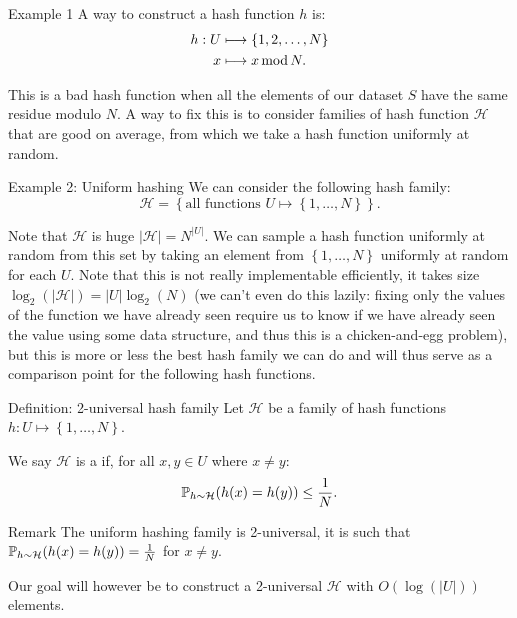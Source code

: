 \documentclass[a4paper]{article}
\begin{document}
\begin{parag}{Example 1}
    A way to construct a hash function $h$ is: 
    \[\begin{split}
    h: U &\longmapsto \left\{1, 2, \ldots, N\right\} \\
    x &\longmapsto x \Mod N.
    \end{split}\]
    
    This is a bad hash function when all the elements of our dataset $S$ have the same residue modulo $N$. A way to fix this is to consider families of hash function $\mathcal{H}$ that are good on average, from which we take a hash function uniformly at random.
\end{parag}

\begin{parag}{Example 2: Uniform hashing}
    We can consider the following hash family: 
    \[\mathcal{H} = \left\{\text{all functions $U \mapsto \left\{1, \ldots, N\right\}$}\right\}.\]

    Note that $\mathcal{H}$ is huge $\left|\mathcal{H}\right| = N^{\left|U\right|}$. We can sample a hash function uniformly at random from this set by taking an element from $\left\{1, \ldots, N\right\}$ uniformly at random for each $U$. Note that this is not really implementable efficiently, it takes size $\log_2\left(\left|\mathcal{H}\right|\right) = \left|U\right|\log_2\left(N\right)$ (we can't even do this lazily: fixing only the values of the function we have already seen require us to know if we have already seen the value using some data structure, and thus this is a chicken-and-egg problem), but this is more or less the best hash family we can do and will thus serve as a comparison point for the following hash functions.
\end{parag}

\begin{parag}{Definition: 2-universal hash family}
    Let $\mathcal{H}$ be a family of hash functions $h: U \mapsto \left\{1, \ldots, N\right\}$.

    We say $\mathcal{H}$ is a  if, for all $x, y \in U$ where $x \neq y$: 
    \[\prob_{h \followsdistr \mathcal{H}}\left(h\left(x\right) = h\left(y\right)\right) \leq \frac{1}{N}.\]

    \begin{subparag}{Remark}
        The uniform hashing family is 2-universal, it is such that $\prob_{h \followsdistr \mathcal{H}}\left(h\left(x\right) = h\left(y\right)\right) = \frac{1}{N}$ for $x \neq y$.

        Our goal will however be to construct a 2-universal $\mathcal{H}$ with $O\left(\log\left(\left|U\right|\right)\right)$ elements.
    \end{subparag}
\end{parag}
\end{document}
